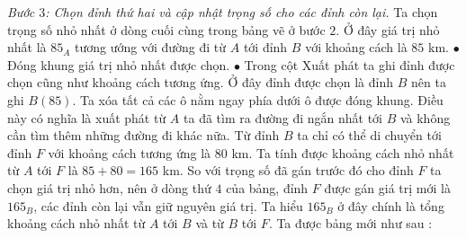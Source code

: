 \begin{multicols}{2}
	\begin{table}[H]
		\vspace*{-5pt}
		\centering
		\captionsetup{labelformat= empty, justification=centering}
		\vspace*{-10pt}
	\end{table}
	\textit{Bước $3$: Chọn đỉnh thứ hai và cập nhật trọng số cho các đỉnh còn lại.}  Ta chọn trọng số nhỏ nhất ở dòng cuối cùng trong bảng vẽ ở bước $2$. Ở đây giá trị nhỏ nhất là $85_A$ tương ướng với đường đi từ $A$ tới đỉnh $B$ với khoảng cách là  $85$ km.
	\vskip 0.1cm
	$\bullet$ Đóng khung giá trị nhỏ nhất được chọn. 
	\vskip 0.1cm
	$\bullet$ Trong cột Xuất phát ta ghi đỉnh được chọn cũng như khoảng cách tương ứng. Ở đây đỉnh được chọn là đỉnh $B$ nên ta ghi $B(85)$.
	\vskip 0.1cm
	Ta xóa tất cả các ô nằm ngay phía dưới ô được đóng khung. Điều này có nghĩa là xuất phát từ $A$ ta đã tìm ra đường đi ngắn nhất tới $B$ và không cần tìm thêm những đường đi khác nữa. 
	\vskip 0.1cm
	Từ đỉnh $B$ ta chỉ có thể di chuyển tới đỉnh $F$ với khoảng cách tương ứng là $80$ km. Ta tính được khoảng cách nhỏ nhất từ $A$ tới $F$ là $85+80=165$ km. So với trọng số đã gán trước đó cho đỉnh $F$ ta chọn giá trị nhỏ hơn, nên ở dòng thứ $4$ của bảng, đỉnh $F$ được gán giá trị mới là $165_B$, các đỉnh còn lại vẫn giữ nguyên giá trị. Ta hiểu $165_B$ ở đây chính là tổng khoảng cách nhỏ nhất từ $A$ tới $B$ và từ $B$ tới $F$.
	\vskip 0.1cm 
	Ta được bảng mới như sau : 
	\begin{table}[H]
		\vspace*{-5pt}
		\centering
		\captionsetup{labelformat= empty, justification=centering}
\end{table}
\end{multicols}
